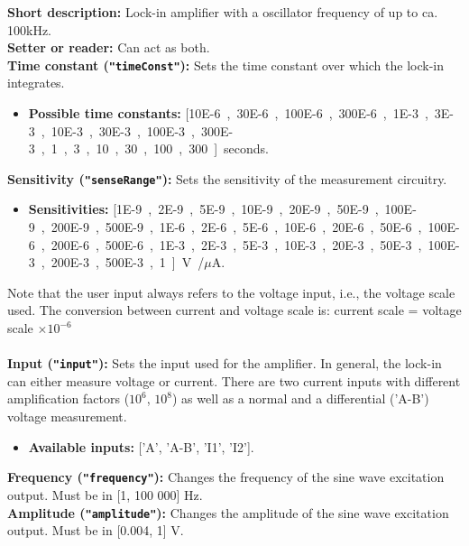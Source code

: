 \textbf{\textsf{Short description}:} Lock-in amplifier with a oscillator frequency of up to ca. 100kHz.\\
\textbf{\textsf{Setter or reader}:} Can act as both.\\
\textbf{\textsf{Time constant} (\texttt{"timeConst"}):} Sets the time constant over which the lock-in integrates.\\
\begin{itemize}[noitemsep]
\item \textbf{\textsf{Possible time constants:}} [\SI{10E-6}, \SI{30E-6}, \SI{100E-6},\SI{300E-6}, \SI{1E-3}, \SI{3E-3}, \SI{10E-3}, \SI{30E-3}, \SI{100E-3},\SI{300E-3},1, 3, 10, 30, 100, 300] seconds.
\end{itemize}
\textbf{\textsf{Sensitivity} (\texttt{"senseRange"}):} Sets the sensitivity of the measurement circuitry.\\
\begin{itemize}[noitemsep]
\item \textbf{\textsf{Sensitivities}:} [\SI{1E-9}, \SI{2E-9}, \SI{5E-9}, \SI{10E-9}, \SI{20E-9}, \SI{50E-9}, \SI{100E-9}, \SI{200E-9}, \SI{500E-9}, \SI{1E-6}, \SI{2E-6}, \SI{5E-6}, \SI{10E-6}, \SI{20E-6}, \SI{50E-6}, \SI{100E-6}, \SI{200E-6}, \SI{500E-6}, \SI{1E-3}, \SI{2E-3}, \SI{5E-3}, \SI{10E-3}, \SI{20E-3}, \SI{50E-3}, \SI{100E-3}, \SI{200E-3}, \SI{500E-3}, 1] V/$\mu$A.
\end{itemize}
Note that the user input always refers to the voltage input, i.e., the voltage scale used. The conversion between current and voltage scale is: current scale = voltage scale $\times 10^{-6}$\\
\\
\textbf{\textsf{Input} (\texttt{"input"}):} Sets the input used for the amplifier. In general, the lock-in can either measure voltage or current. There are two current inputs with different amplification factors ($10^6$, $10^8$) as well as a normal and a differential ('A-B') voltage measurement.\\
\begin{itemize}[noitemsep]
\item \textbf{\textsf{Available inputs:}} ['A', 'A-B', 'I1', 'I2'].
\end{itemize}
\textbf{\textsf{Frequency} (\texttt{"frequency"}):} Changes the frequency of the sine wave excitation output. Must be in [1, 100 000] Hz.\\
\textbf{\textsf{Amplitude} (\texttt{"amplitude"}):} Changes the amplitude of the sine wave excitation output. Must be in [0.004, 1] V.\\
